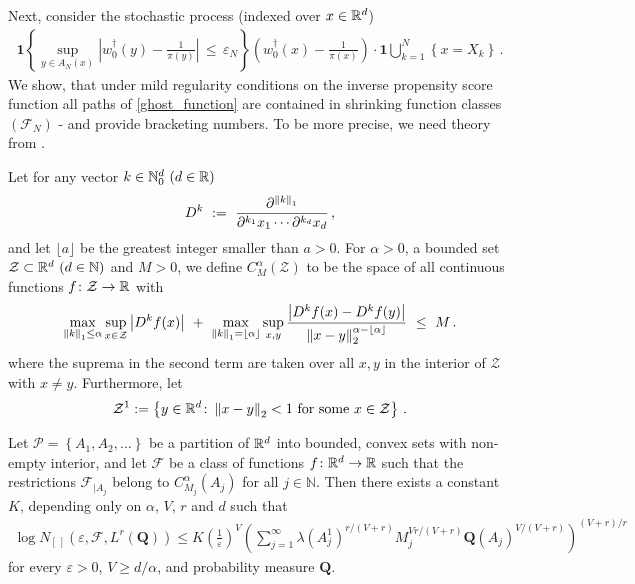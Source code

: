 Next, consider the stochastic process (indexed over $x\in\mathbb{R}^d$)
\begin{gather}
  \label{ghost_function}
  \mathbf{1}{
    \left\{ 
      \sup_{y\in A_N(x)}
      \left| 
      w_0^\dagger(y)
      -
      \frac{1}{\pi(y)}
      \right|
      \,
      \le
      \,
      \varepsilon_N
    \right\}
  }
  \left( 
    w_0^\dagger(x)
      -
      \frac{1}{\pi(x)}
  \right)
  \cdot
  \mathbf{1}
  \bigcup_{k=1}^N
  \left\{ x=X_k \right\}
  \,.
\end{gather}
We show, 
that under mild regularity conditions on the inverse propensity score function all paths of \eqref{ghost_function} are contained in shrinking function classes $(\mathcal{F}_N)$ - and provide bracketing numbers. 
To be more precise, we need theory from \cite[§2.7.1]{vaart2013}.

Let for any vector $k\in\mathbb{N}_0^d \ (d\in\R)$
\begin{gather*}
  D^k
  \ :=\ 
  \frac
  {\partial^{\norm{k}_1}}
  {
    \partial^{k_1}x_1
    \cdots
    \partial^{k_d}x_d
  }
  \,,
\end{gather*}
and let $\lfloor a \rfloor$ be the greatest integer smaller than $a>0$.
For $\alpha>0$, a bounded set 
$\mathcal{Z}\subset\R^d\ (d\in\mathbb{N})$
and
$M>0$, we define $C^\alpha_M(\mathcal{Z})$ to be the space of all continuous functions $f\colon \mathcal{Z}\to\mathbb{R}$ with
\begin{gather*}
  \max_{\norm{k}_1\le \alpha}\sup_{x\in\mathcal{Z}}
  \left| D^k f(x) \right|
  \ 
  +
  \ 
  \max_{\norm{k}_1=\lfloor \alpha \rfloor}\sup_{x,y}
  \frac
  {
  \left|
  D^k f(x) 
  -
  D^k f(y) 
  \right|
  }
  {
    \norm{x-y}_2^{\alpha-\lfloor \alpha \rfloor}
  }
  \
  \le
  \ 
  M
  \,.
\end{gather*}
where the suprema in the second term are taken over all $x,y$ in the interior of $\mathcal{Z}$ with $x\neq y$.
Furthermore, let
\begin{gather*}
  \mathcal{Z}^1
  :=
  \left\{ 
    y\in\R^d
    \colon
    \norm{x-y}_2 <1
    \ 
    \text{for some}\ x\in\mathcal{Z}
  \right\}
  \,.
\end{gather*}
\begin{lemma}
  \label{vdv_coro}
  Let $\mathcal{P}=\left\{ A_1,A_2,\ldots \right\}$ be a partition of $\mathbb{R}^d$ into bounded, convex sets with non-empty interior, and let $\mathcal{F}$ be a class of functions $f\colon\mathbb{R}^d\to\mathbb{R}$ such that the restrictions $\mathcal{F}_{|A_j}$ belong to $C^\alpha_{M_j}(A_j)$
  for all $j\in\mathbb{N}$.
  Then there exists a constant $K$, depending only on $\alpha$, $V$, $r$ and $d$
  such that
  \begin{gather}
    \label{667}
    \log
    N_{[\,]}
    (
    \varepsilon
    ,
    \mathcal{F}
    ,
    L^r(\mathbf{Q})
    )
    \le
    K
    \left( \frac{1}{\varepsilon} \right)^V
    \left( 
      \sum_{j=1}^{\infty}
      \lambda(A_j^1)^{r/(V+r)}
      M_j^{Vr/(V+r)}
      \mathbf{Q}(A_j)^{V/(V+r)}
    \right)
    ^{(V+r)/r}
  \end{gather}
  for every $\varepsilon>0$, $V\ge d/\alpha$, and probability measure $\mathbf{Q}$.
\end{lemma}
